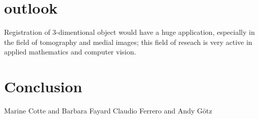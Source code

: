 \documentclass[preprint]{iucr}
\begin{document}
\section{outlook}

Registration of 3-dimentional object would have a huge application, especially
in the field of tomography and medial images; this field of reseach is very
active in applied mathematics and computer vision.


\section{Conclusion}


Marine Cotte and Barbara Fayard
Claudio Ferrero and Andy G\"otz



\end{document}
